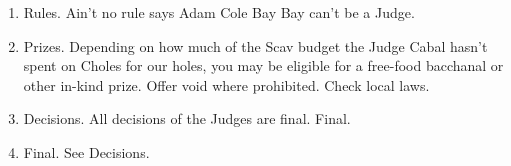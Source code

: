 \documentclass{book}
\begin{document}
\begin{enumerate}
\item Rules. Ain't no rule says Adam Cole Bay Bay can't be a Judge.

\item Prizes. Depending on how much of the Scav budget the Judge Cabal hasn't spent on Choles for our holes, you may be eligible for a free-food bacchanal or other in-kind prize. Offer void where prohibited. Check local laws.

\item Decisions. All decisions of the Judges are final. Final.

\item Final. See Decisions.

\end{enumerate}



\end{document}
